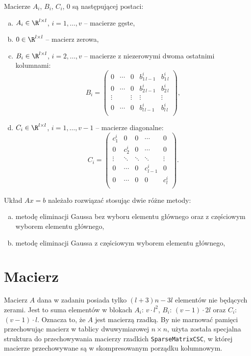 \documentclass[12pt]{article}
\begin{document}
Macierze $A_i$, $B_i$, $C_i$, $0$ są następującej postaci:
\begin{enumerate}[(a)]
\item $A_i \in \R^{l\times l}$,   $i = 1, \ldots,v$ -- macierze gęste,
\item $0 \in \R^{l\times l}$ -- macierz zerowa, 
\item $B_i \in \R^{l\times l}$,   $i = 2, \ldots,v$ -- macierze z niezerowymi dwoma ostatnimi kolumnami:
\begin{equation}
B_i =
\left(\begin{array}{ccccc}
0 & \cdots & 0 & b_{1\,l-1}^i & b_{1\,l}^i \\
0 & \cdots & 0 & b_{2\,l-1}^i & b_{2\,l}^i \\
\vdots & & \vdots & \vdots & \vdots \\
0 & \cdots & 0 & b_{l\,l-1}^i & b_{l\,l}^i \\
\end{array}\right),
\end{equation} 
\item $C_i \in \R^{l\times l}$,   $i = 1, \ldots,v\!-\!1$ -- macierze diagonalne:
\begin{equation}
C_i =
\left(\begin{array}{ccccc}
 c_{1}^i & 0 & 0 & \cdots & 0  \\
0 &  c_{2}^i &  0 & \cdots & 0  \\
\vdots &  \ddots &  \ddots & \ddots & \vdots  \\
0 & \cdots & 0 &  c_{l-1}^i & 0 \\
0 & \cdots & 0 &  0 & c_{l}^i \\
\end{array}\right).
\end{equation} 
\end{enumerate}

Układ $Ax = b$ należało rozwiązać stosując dwie różne metody:
\begin{enumerate}[(a)]
\item metodę eliminacji Gaussa bez wyboru elementu głównego oraz z częściowym wyborem elementu głównego,   
\item metodę eliminacji Gaussa z częściowym wyborem elementu głównego, 
\end{enumerate}

\section{Macierz}
Macierz $A$ dana w zadaniu posiada tylko $(l + 3)n - 3 l$ elementów nie będących zerami. Jest to suma elementów w blokach $A_i$: $v \cdot l^2$, $B_i$: $(v-1) \cdot 2l$ oraz $C_i$: $(v-1) \cdot l$. Oznacza to, że $A$ jest macierzą rzadką. By nie marnować pamięci przechowując macierz w tablicy dwuwymiarowej $n\times n$, użyta została specjalna struktura do przechowywania macierzy rzadkich \texttt{SparseMatrixCSC}, w której macierze przechowywane są w skompresowanym porządku kolumnowym.
\end{document}
